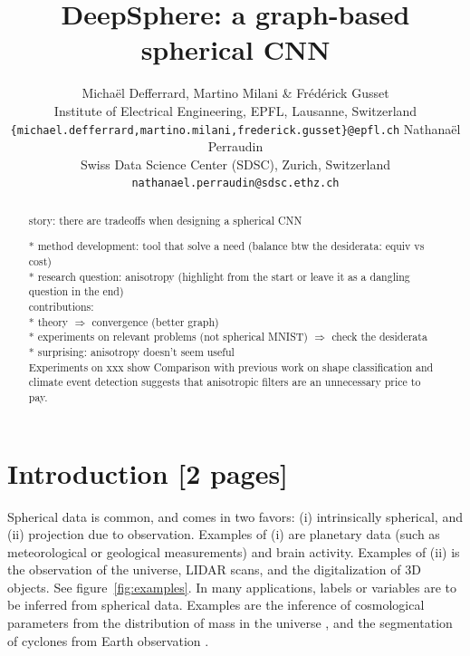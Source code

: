 \documentclass{article} %
\title{DeepSphere: a graph-based spherical CNN}
\author{Michaël Defferrard, Martino Milani \& Frédérick Gusset \\
Institute of Electrical Engineering, EPFL, Lausanne, Switzerland \\
\texttt{\{michael.defferrard,martino.milani,frederick.gusset\}@epfl.ch}
\AND
Nathanaël Perraudin \\
Swiss Data Science Center (SDSC), Zurich, Switzerland \\
\texttt{nathanael.perraudin@sdsc.ethz.ch}
}
\newcommand{\todo}[1]{{\color[rgb]{.6,.1,.6}{#1}}}
\renewcommand{\figref}[1]{figure~\ref{fig:#1}}
\begin{document}
\maketitle

\begin{abstract}

story: there are tradeoffs when designing a spherical CNN

* method development: tool that solve a need (balance btw the desiderata: equiv vs cost)\\
* research question: anisotropy (highlight from the start or leave it as a dangling question in the end)\\

contributions:\\
* theory $\Rightarrow$ convergence (better graph)\\
* experiments on relevant problems (not spherical MNIST) $\Rightarrow$ check the desiderata\\
  * surprising: anisotropy doesn't seem useful\\

Experiments on xxx show
Comparison with previous work on shape classification and climate event detection suggests that anisotropic filters are an unnecessary price to pay.

\end{abstract}

\todo{
	* adjacency matrix: $A$ instead of $W$? \\
	* anonymize DeepSphere citation \\
	* climate spherical figure: inputs with TC and AR labels superimposed \\
	* citet for inline, citep for parenthesis \\
}

\section{Introduction [2 pages]}

Spherical data is common, and comes in two favors: (i) intrinsically spherical, and (ii) projection due to observation.
Examples of (i) are planetary data (such as meteorological or geological measurements) and brain activity.
Examples of (ii) is the observation of the universe, LIDAR scans, and the digitalization of 3D objects. %
See \figref{examples}.
In many applications, labels or variables are to be inferred from spherical data.
Examples are the inference of cosmological parameters from the distribution of mass in the universe \citep{perraudin2019deepspherecosmo}, and the segmentation of cyclones from Earth observation \citep{mudigonda2017climateevents}.
\end{document}
